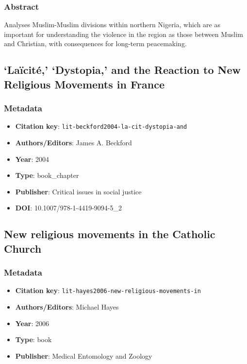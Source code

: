 \subsubsection*{Abstract}
Analyses Muslim-Muslim divisions within northern Nigeria, which are as important for understanding the violence in the region as those between Muslim and Christian, with consequences for long-term peacemaking.

\subsection{‘Laïcité,’ ‘Dystopia,’ and the Reaction to New Religious Movements in France}\label{lit:lit-beckford2004-la-cit-dystopia-and}
\subsubsection*{Metadata}
\begin{itemize}
  \item \textbf{Citation key}: \texttt{lit-beckford2004-la-cit-dystopia-and}
  \item \textbf{Authors/Editors}: James A. Beckford
  \item \textbf{Year}: 2004
  \item \textbf{Type}: book\_chapter
  \item \textbf{Publisher}: Critical issues in social justice
  \item \textbf{DOI}: 10.1007/978-1-4419-9094-5\_2
\end{itemize}

\subsection{New religious movements in the Catholic Church}\label{lit:lit-hayes2006-new-religious-movements-in}
\subsubsection*{Metadata}
\begin{itemize}
  \item \textbf{Citation key}: \texttt{lit-hayes2006-new-religious-movements-in}
  \item \textbf{Authors/Editors}: Michael Hayes
  \item \textbf{Year}: 2006
  \item \textbf{Type}: book
  \item \textbf{Publisher}: Medical Entomology and Zoology
\end{itemize}
